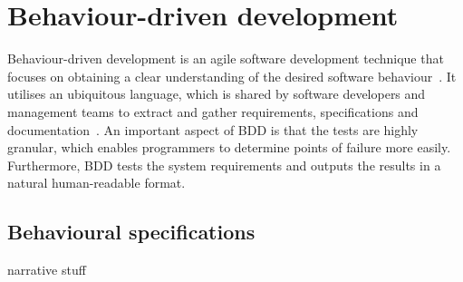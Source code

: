 \section{Behaviour-driven development} {
\label{sec:behaviour_driven_development}

	Behaviour-driven development is an agile software development technique that focuses on obtaining a clear understanding of the desired software behaviour~\parencite{rice2014bdd}. It utilises an ubiquitous language, which is shared by software developers and management teams to extract and gather requirements, specifications and documentation~\parencite{bellware2015bdd, evans2004domain}. An important aspect of BDD is that the tests are highly granular, which enables programmers to determine points of failure more easily. Furthermore, BDD tests the system requirements and outputs the results in a natural human-readable format.

	\subsection{Behavioural specifications} {

		narrative stuff



	}

}

